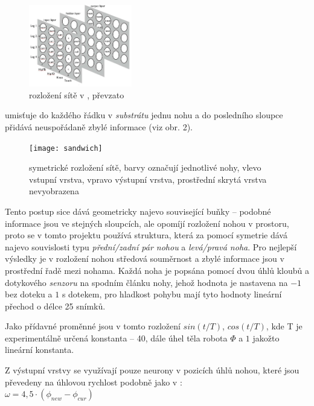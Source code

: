 \documentclass[a4]{article}
\begin{document}
\begin{figure}
  \begin{center}
    \includegraphics[width=0.4\textwidth]{clunenet}
  \end{center}
  \caption{rozložení sítě v \cite{clunegait}, převzato \cite{clunegait}}
\end{figure}

\cite{clunegait} umisťuje do každého řádku v \emph{substrátu} jednu nohu a do posledního sloupce přidává neuspořádaně zbylé informace (viz obr. 2).\par
\begin{figure}
  \begin{center}
    \texttt{[image: sandwich]}
  \end{center}
  \caption{symetrické rozložení sítě, barvy označují jednotlivé nohy, vlevo vstupní vrstva, vpravo výstupní vrstva, prostřední skrytá vrstva nevyobrazena}
\end{figure}
Tento postup sice dává geometricky najevo související buňky -- podobné informace jsou ve stejných sloupcích, ale opomíjí rozložení nohou v prostoru, proto se v tomto projektu používá struktura, která za pomocí symetrie dává najevo souvislosti typu \emph{přední/zadní pár nohou} a \emph{levá/pravá noha}. Pro nejlepší výsledky je v rozložení nohou středová souměrnost a zbylé informace jsou v prostřední řadě mezi nohama. Každá noha je popsána pomocí dvou úhlů kloubů a dotykového \emph{senzoru} na spodním článku nohy, jehož hodnota je nastavena na $-1$ bez doteku a $1$ s dotekem, pro hladkost pohybu mají tyto hodnoty lineární přechod o délce 25 snímků.\par
Jako přídavné proměnné jsou v tomto rozložení $sin(t/T)$, $cos(t/T)$, kde T je experimentálně určená konstanta -- 40, dále úhel těla robota $\Phi$ a $1$ jakožto lineární konstanta.\par
Z výstupní vrstvy se využívají pouze neurony v pozicích úhlů nohou, které jsou převedeny na úhlovou rychlost podobně jako v \cite{clunegait}:\\
$\omega = 4,5\cdot(\phi_{new} - \phi_{cur})$
\end{document}
